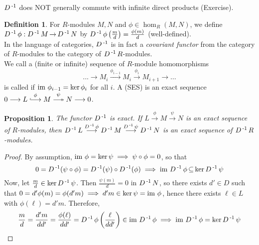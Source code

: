 \documentclass[11pt]{book}
\newcounter{counter}
\newtheorem{proposition}[counter]{Proposition}   \newtheorem{problem}[counter]{Problem}   \newtheorem*{proposition*}{Proposition}   \newtheorem*{lemma*}{Lemma}
\theoremstyle{definition}   \newtheorem{defn}[counter]{Definition} %
\newcommand{\hooklongrightarrow}{\lhook\joinrel\longrightarrow}   \newcommand{\twoheadlongrightarrow}{\relbar\joinrel\twoheadrightarrow}
\newcommand{\mses}[5]{0 \longrightarrow #1 \overset{#2}{\hooklongrightarrow} #3 \overset{#4}{\twoheadlongrightarrow} #5 \longrightarrow 0}
\DeclareMathOperator{\ra}{\rightarrow}   \DeclareMathOperator{\Poly}{\mathbf{P}}   \DeclareMathOperator{\spn}{\textnormal{span}}   \DeclareMathOperator{\aut}{\textnormal{Aut}}
\newcommand{\vs}{\vspace{8pt}}
\numberwithin{counter}{chapter}
\begin{document}
\vs

\begin{remark}
$D\operatorname{^{-1}}$ does NOT generally commute with infinite direct products (Exercise).
\end{remark}

\vs

\begin{defn}
For $R$-modules $M,N$ and $\phi \in \hom_R(M,N)$, we define $D\inv \phi : D\inv M \ra D\inv N$ by $D\operatorname{^{-1}}\phi \left(\frac{m}{d}\right) = \frac{\phi(m)}{d}$ (well-defined). \\

In the language of categories, $D\operatorname{^{-1}}$ is in fact a \emph{covariant functor} from the category of $R$-modules to the category of $D\operatorname{^{-1}} R$-modules. \\

We call a (finite or infinite) sequence of $R$-module homomorphisms
	\[...\longrightarrow M_i \overset{\phi_{i-1}}{\longrightarrow} M_i \overset{\phi_i}{\longrightarrow} M_{i+1} \longrightarrow \dots \]
is called  if $\textnormal{im } \phi_{i-1} = \ker \phi_i$ for all $i$. A  (SES) is an exact sequence \\ $\mses{L}{\phi}{M}{\psi}{N}$.
\end{defn}

\vs

\begin{proposition}
The functor $D\operatorname{^{-1}}$ is exact. If $L \overset{\phi}{\longrightarrow} M \overset{\psi}{\longrightarrow} N$ is an exact sequence of $R$-modules, then $D\operatorname{^{-1}} L \overset{D\operatorname{^{-1}} \phi}{\longrightarrow} D\operatorname{^{-1}} M \overset{D\operatorname{^{-1}} \psi}{\longrightarrow} D\operatorname{^{-1}} N$ is an exact sequence of $D\operatorname{^{-1}} R$-modules.
\end{proposition}

\begin{proof}
By assumption, $\textnormal{im } \phi = \ker \psi \implies \psi \circ \phi = 0$, so that
	\[0 = D\operatorname{^{-1}}(\psi \circ \phi) = D\operatorname{^{-1}}(\psi) \circ D\operatorname{^{-1}}(\phi) \implies \textnormal{im } D\operatorname{^{-1}} \phi \operatorname{\subseteq} \ker D\operatorname{^{-1}} \psi \]
Now, let $\frac{m}{d} \in \ker D\operatorname{^{-1}} \psi$. Then $\frac{\psi(m)}{d} = 0$ in $D\operatorname{^{-1}} N$, so there exists $d' \in D$ such that $0 = d'\phi(m) = \phi(d'm) \implies d'm \in \ker \psi = \textnormal{im } \phi$, hence there exists $\ell \in L$ with $\phi(\ell) = d'm$. Therefore,
	\[\frac{m}{d} = \frac{d'm}{dd'} = \frac{\phi(\ell)}{dd'} = D\operatorname{^{-1}} \phi \left(\frac{\ell}{dd'} \right) \in \textnormal{im } D\operatorname{^{-1}} \phi \implies \textnormal{im } D\operatorname{^{-1}} \phi = \ker D\operatorname{^{-1}} \psi \]
\end{proof}
\end{document}
